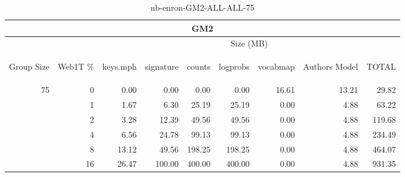 \begin{center}
\begin{table}[htbp] 
 \begin{center}
\begin{tabular}{ | r | r | r | r | r | r | r | r | r |}
\hline
\multicolumn{9}{|c|}{GM2}\\
\hline
 & & \multicolumn{7}{|c|}{Size (MB)}\\ \cline{3-9}
\begin{sideways}Group Size\end{sideways} & \begin{sideways}Web1T \% \end{sideways} & \begin{sideways}keys.mph\end{sideways} & \begin{sideways}signature\end{sideways} & \begin{sideways}counts\end{sideways} & \begin{sideways}logprobs\end{sideways} & \begin{sideways}vocabmap\end{sideways} & \begin{sideways}Authors Model \end{sideways} & \begin{sideways}TOTAL\end{sideways}\\
\hline
\multirow{5}{*}{75}
 & 0 & 0.00 & 0.00 & 0.00 & 0.00 & 16.61 & 13.21 & 29.82\\ \cline{2-9}
 & 1 & 1.67 & 6.30 & 25.19 & 25.19 & 0.00 & 4.88 & 63.22\\ \cline{2-9}
 & 2 & 3.28 & 12.39 & 49.56 & 49.56 & 0.00 & 4.88 & 119.68\\ \cline{2-9}
 & 4 & 6.56 & 24.78 & 99.13 & 99.13 & 0.00 & 4.88 & 234.49\\ \cline{2-9}
 & 8 & 13.12 & 49.56 & 198.25 & 198.25 & 0.00 & 4.88 & 464.07\\ \cline{2-9}
 & 16 & 26.47 & 100.00 & 400.00 & 400.00 & 0.00 & 4.88 & 931.35\\ \cline{2-9}
\hline
\end{tabular}
\caption{nb-enron-GM2-ALL-ALL-75}
\label{table:nb-enron-GM2-ALL-ALL-75}
\end{center}
 \end{table}
\end{center}

